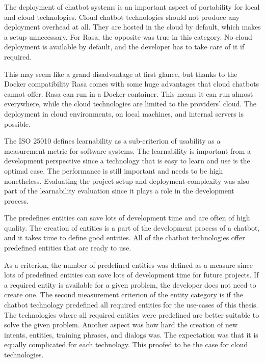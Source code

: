 The deployment of chatbot systems is an important aspect of portability for local and cloud technologies.
Cloud chatbot technologies should not produce any deployment overhead at all.
They are hosted in the cloud by default, which makes a setup unnecessary.
For Rasa, the opposite was true in this category.
No cloud deployment is available by default, and the developer has to take care of it if required.

This may seem like a grand disadvantage at first glance, but thanks to the Docker compatibility Rasa comes with some huge advantages that cloud chatbots cannot offer.
Rasa can run in a Docker container.
This means it can run almost everywhere, while the cloud technologies are limited to the providers' cloud.
The deployment in cloud environments, on local machines, and internal servers is possible.

The ISO 25010\cite{iso25010} defines learnability as a sub-criterion of usability as a measurement metric for software systems.
The learnability is important from a development perspective since a technology that is easy to learn and use is the optimal case.
The performance is still important and needs to be high nonetheless.
Evaluating the project setup and deployment complexity was also part of the learnability evaluation since it plays a role in the development process.

The predefines entities can save lots of development time and are often of high quality.
The creation of entities is a part of the development process of a chatbot, and it takes time to define good entities.
All of the chatbot technologies offer predefined entities that are ready to use.

As a criterion, the number of predefined entities was defined as a measure since lots of predefined entities can save lots of development time for future projects.
If a required entity is available for a given problem, the developer does not need to create one.
The second measurement criterion of the entity category is if the chatbot technology predefined all required entities for the use-cases of this thesis.
The technologies where all required entities were predefined are better suitable to solve the given problem.
Another aspect was how hard the creation of new intents, entities, training phrases, and dialogs was.
The expectation was that it is equally complicated for each technology. This proofed to be the case for cloud technologies.

